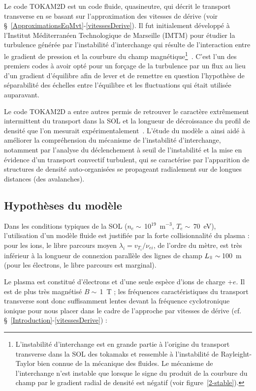 \begin{refsection}
Le code TOKAM2D est un code fluide, quasineutre, qui décrit le transport
transverse en se basant sur l'approximation des vitesses de dérive (voir
\S~\ref{ApproximationsEqMvt}-\ref{vitessesDerive}). Il fut initialement
développé à l'Institut Méditerranéen Technologique de Marseille (IMTM) pour
étudier la turbulence générée par l'instabilité
d'interchange qui résulte de
l'interaction entre le gradient de pression et la courbure du champ
magnétique\footnote{L'instabilité d'interchange est en grande partie
à l'origine du transport transverse dans la SOL des tokamaks et ressemble à l'instabilité de Rayleight-Taylor bien
connue de la mécanique des fluides.
Le mécanisme de l'interchange n'est instable que lorsque le signe du produit de
la courbure du champ par le gradient radial de densité est négatif (voir
figure~\ref{2-stable}).}~\parencite{Garbet}.
C'est l'un des premiers codes à avoir opté pour un forçage de la turbulence par
un flux au lieu d'un gradient d'équilibre afin de lever et de remettre en question l'hypothèse de séparabilité des échelles entre l'équilibre et les fluctuations qui était utilisée auparavant.

Le code TOKAM2D a entre autres permis de retrouver le caractère extrêmement
intermittent du transport dans la SOL et la longueur de décroissance du profil de densité que l'on
mesurait expérimentalement~\cite{SarazinPhD}. L'étude du modèle a ainsi aidé à
améliorer la compréhension du mécanisme de l'instabilité d'interchange,
notamment par l'analyse
du déclenchement à seuil de l'instabilité et la mise en évidence d'un transport
convectif turbulent, qui se caractérise par l'apparition de structures de
densité auto-organisées se propageant radialement sur de longues distances (des avalanches).

\subsection{Hypothèses du modèle}
\label{2-hypotheses}
Dans les conditions typiques de la SOL ($n_e\sim\,$10$^{19}$~m$^{-3}$,
$T_e\sim\,$70~eV), l'utilisation d'un modèle fluide est justifiée par la forte
collisionnalité du plasma : pour les ions, le libre parcours moyen
$\lambda_i=v_{{T}_{i}}/\nu_{ei}$, de l'ordre du mètre, est très
inférieur à la longueur de connexion parallèle des lignes de champ
$L_\para\sim\,$100~m (pour les électrons, le libre parcours est marginal).

Le plasma est constitué d'électrons et d'une seule espèce d'ions de charge +$e$.
Il est de plus très magnétisé $B\sim\,$1~T ; les fréquences caractéristiques du
transport transverse sont donc suffisamment lentes devant la fréquence cyclotronique
ionique pour nous placer dans le cadre de l'approche par vitesses de dérive (cf.
\S~\ref{Introduction}-\ref{vitessesDerive}) :


\end{refsection}
